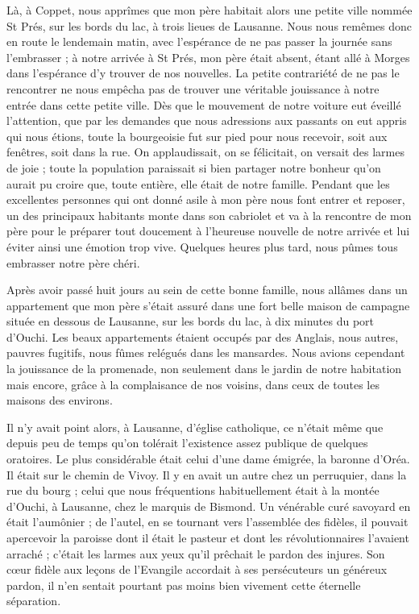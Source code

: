 \documentclass[11pt,a4paper]{report}
\begin{document}
Là, à Coppet, nous apprîmes que mon père habitait alors une petite ville nommée St Prés, sur les bords du lac, à trois lieues de Lausanne. Nous nous remêmes donc en route le lendemain matin, avec l'espérance de ne pas passer la journée sans l'embrasser ; à notre arrivée à St Prés, mon père était absent, étant allé à Morges dans l'espérance d'y trouver de nos nouvelles. La petite contrariété de ne pas le rencontrer ne nous empêcha pas de trouver une véritable jouissance à notre entrée dans cette petite ville. Dès que le mouvement de notre voiture eut éveillé l'attention, que par les demandes que nous adressions aux passants on eut appris qui nous étions, toute la bourgeoisie fut sur pied pour nous recevoir, soit aux fenêtres, soit dans la rue. On applaudissait, on se félicitait, on versait des larmes de joie ; toute la population paraissait si bien partager notre bonheur qu'on aurait pu croire que, toute entière, elle était de notre famille. Pendant que les excellentes personnes qui ont donné asile à mon père nous font entrer et reposer, un des principaux habitants monte dans son cabriolet et va à la rencontre de mon père pour le préparer tout doucement à l'heureuse nouvelle de notre arrivée et lui éviter ainsi une émotion trop vive. Quelques heures plus tard, nous pûmes tous embrasser notre père chéri.

Après avoir passé huit jours au sein de cette bonne famille, nous allâmes dans un appartement que mon père s'était assuré dans une fort belle maison de campagne située en dessous de Lausanne, sur les bords du lac, à dix minutes du port d'Ouchi. Les beaux appartements étaient occupés par des Anglais, nous autres, pauvres fugitifs, nous fûmes relégués dans les mansardes. Nous avions cependant la jouissance de la promenade, non seulement dans le jardin de notre habitation mais encore, grâce à la complaisance de nos voisins, dans ceux de toutes les maisons des environs.

Il n'y avait point alors, à Lausanne, d'église catholique, ce n'était même que depuis peu de temps qu'on tolérait l'existence assez publique de quelques oratoires. Le plus considérable était celui d'une dame émigrée, la baronne d'Oréa. Il était sur le chemin de Vivoy. Il y en avait un autre chez un perruquier, dans la rue du bourg ; celui que nous fréquentions habituellement était à la montée d'Ouchi, à Lausanne, chez le marquis de Bismond. Un vénérable curé savoyard en était l'aumônier ; de l'autel, en se tournant vers l'assemblée des fidèles, il pouvait apercevoir la paroisse dont il était le pasteur et dont les révolutionnaires l'avaient arraché ; c'était les larmes aux yeux qu'il prêchait le pardon des injures. Son cœur fidèle aux leçons de l'Evangile accordait à ses persécuteurs un généreux pardon, il n'en sentait pourtant pas moins bien vivement cette éternelle séparation.
\end{document}
